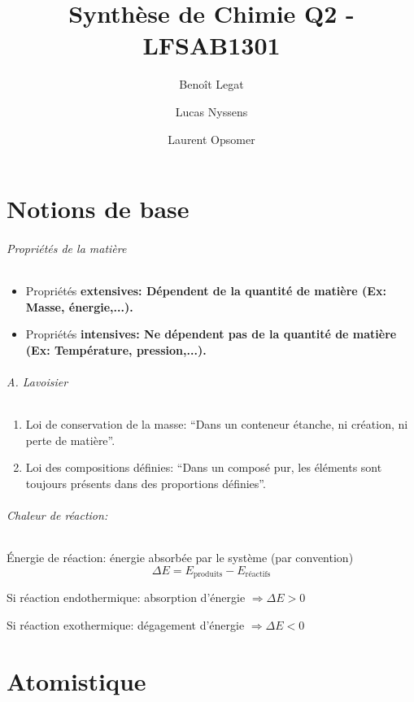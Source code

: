 \documentclass[11pt,a4paper,french]{article}
\title{Synthèse de Chimie Q2 - LFSAB1301}
\author{Benoît Legat \and Lucas Nyssens \and Laurent Opsomer}
\renewcommand{\textbf}[1]{\begingroup\bfseries\mathversion{bold}#1\endgroup}
\begin{document}
\maketitle

\part{Notions de base}

\paragraph{Propriétés de la matière}
\begin{itemize}
	\item Propriétés \textbf{extensives}: Dépendent de la quantité de matière (Ex: Masse, énergie,...).
	\item Propriétés \textbf{intensives}: Ne dépendent pas de la quantité de matière (Ex: Température, pression,...).
\end{itemize}

\paragraph{A. Lavoisier}
\begin{enumerate}
	\item Loi de conservation de la masse: ``Dans un conteneur étanche, ni création, ni perte de matière''.
	\item Loi des compositions définies: ``Dans un composé pur, les éléments sont toujours présents dans des proportions définies''.
\end{enumerate}

\paragraph{Chaleur de réaction:}
\'Energie de réaction: énergie absorbée par le système (par convention)
$$\Delta E = E_{\textrm{produits}}-E_{\textrm{réactifs}}$$

Si réaction endothermique: absorption d'énergie $\Rightarrow \Delta E > 0$

Si réaction exothermique: dégagement d'énergie $\Rightarrow  \Delta E < 0$

\part{Atomistique}

\end{document}
